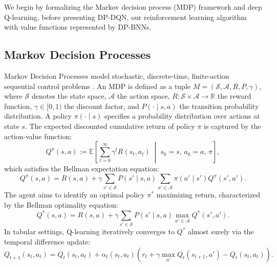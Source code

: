 \documentclass[10pt]{article}
\begin{document}
We begin by formalizing the Markov decision process (MDP) framework and deep Q-learning, before presenting DP-DQN, our reinforcement learning algorithm with value functions represented by DP-BNNs.

\subsection{Markov Decision Processes}
Markov Decision Processes model stochastic, discrete-time, finite-action sequential control problems \citep{puterman1990markov}. An MDP is defined as a tuple $M = (\mathcal{S}, \mathcal{A}, R, P, \gamma)$, where $\mathcal{S}$ denotes the state space, $\mathcal{A}$ the action space, $R: \mathcal{S} \times \mathcal{A} \to \mathbb{R}$ the reward function, $\gamma \in [0, 1)$ the discount factor, and $P(\cdot \mid s, a)$ the transition probability distribution. A policy $\pi(\cdot \mid s)$ specifies a probability distribution over actions at state $s$. The expected discounted cumulative return of policy $\pi$ is captured by the action-value function:
\begin{equation}\label{Eq:expected-return}
Q^{\pi}(s, a) := \mathbb{E}\left[\sum_{t=0}^{\infty} \gamma^{t} R(s_t, a_t) \;\middle|\; s_0 = s, \, a_0 = a, \, \pi \right],
\end{equation}
which satisfies the Bellman expectation equation:
\begin{equation}\label{Eq:Bellman-equation}
Q^{\pi}(s, a) = R(s, a) + \gamma \sum_{s' \in \mathcal{S}} P(s' \mid s, a) \sum_{a' \in \mathcal{A}} \pi(a' \mid s') Q^{\pi}(s', a').
\end{equation}
The agent aims to identify an optimal policy $\pi^*$ maximizing return, characterized by the Bellman optimality equation:
\begin{equation}\label{Eq:Bellman-optimality}
Q^*(s, a) = R(s, a) + \gamma \sum_{s' \in \mathcal{S}} P(s' \mid s, a) \max_{a' \in \mathcal{A}} Q^*(s', a').
\end{equation}
In tabular settings, Q-learning iteratively converges to $Q^*$ almost surely via the temporal difference update:
\begin{equation}\label{Eq:Q-learning}
Q_{t+1}(s_t, a_t) = Q_t(s_t, a_t) + \alpha_t(s_t, a_t) \left( r_t + \gamma \max_{a'} Q_t(s_{t+1}, a') - Q_t(s_t, a_t) \right).
\end{equation}
\end{document}
